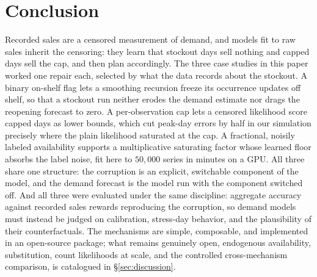 \section{Conclusion}\label{sec:conclusion}

Recorded sales are a censored measurement of demand, and models fit to raw sales inherit the censoring: they learn that stockout days sell nothing and capped days sell the cap, and then plan accordingly. The three case studies in this paper worked one repair each, selected by what the data records about the stockout. A binary on-shelf flag lets a smoothing recursion freeze its occurrence updates off shelf, so that a stockout run neither erodes the demand estimate nor drags the reopening forecast to zero. A per-observation cap lets a censored likelihood score capped days as lower bounds, which cut peak-day errors by half in our simulation precisely where the plain likelihood saturated at the cap. A fractional, noisily labeled availability supports a multiplicative saturating factor whose learned floor absorbs the label noise, fit here to $50{,}000$ series in minutes on a GPU. All three share one structure: the corruption is an explicit, switchable component of the model, and the demand forecast is the model run with the component switched off. And all three were evaluated under the same discipline: aggregate accuracy against recorded sales rewards reproducing the corruption, so demand models must instead be judged on calibration, stress-day behavior, and the plausibility of their counterfactuals. The mechanisms are simple, composable, and implemented in an open-source package; what remains genuinely open, endogenous availability, substitution, count likelihoods at scale, and the controlled cross-mechanism comparison, is catalogued in \S\ref{sec:discussion}.

